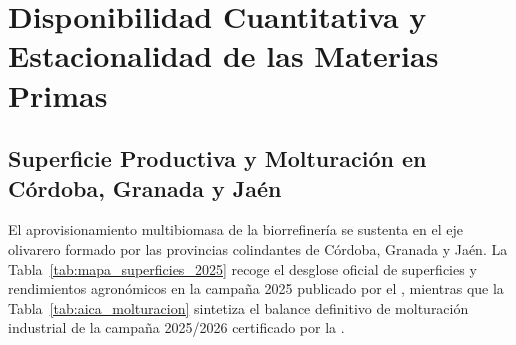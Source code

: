 \documentclass{report}
\begin{document}
\chapter{Disponibilidad Cuantitativa y Estacionalidad de las Materias Primas}

\section{Superficie Productiva y Molturación en Córdoba, Granada y Jaén}
El aprovisionamiento multibiomasa de la biorrefinería se sustenta en el eje olivarero formado por las provincias colindantes de Córdoba, Granada y Jaén. La Tabla~\ref{tab:mapa_superficies_2025} recoge el desglose oficial de superficies y rendimientos agronómicos en la campaña 2025 publicado por el \textcite{MAPA2025}, mientras que la Tabla~\ref{tab:aica_molturacion} sintetiza el balance definitivo de molturación industrial de la campaña 2025/2026 certificado por la \textcite{AICA2026}.
\end{document}
